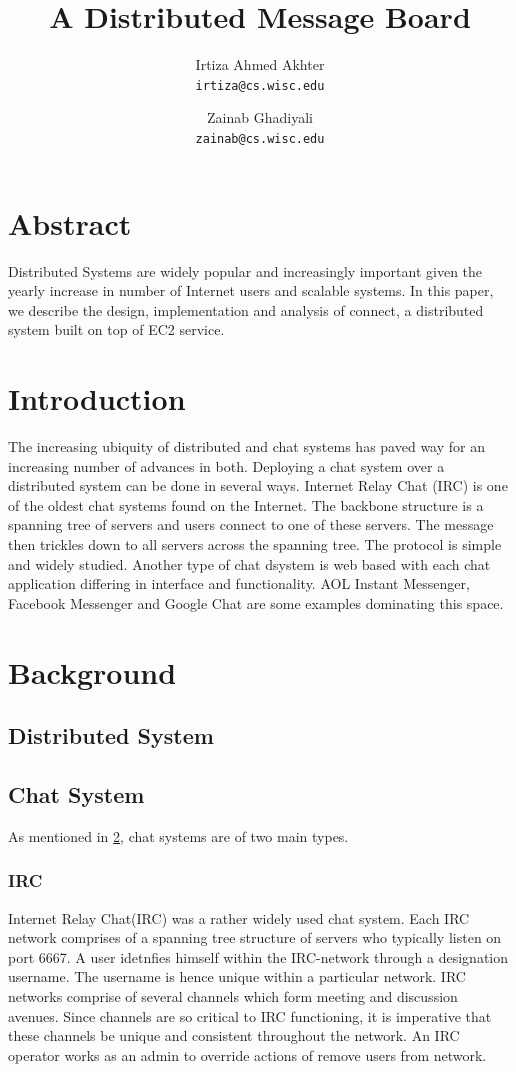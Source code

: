 \documentclass[12pt]{article}
\title{A Distributed Message Board}
\author{Irtiza Ahmed Akhter\\
\texttt{irtiza@cs.wisc.edu} \and Zainab Ghadiyali\\ \texttt{zainab@cs.wisc.edu}}
\begin{document}
\maketitle



\section{Abstract}
Distributed Systems are widely popular and increasingly important given the yearly increase in number of Internet users and scalable systems. In this paper, we describe the design, implementation and analysis of connect, a distributed system built on top of EC2 service. 
\section{Introduction}
\label{Introduction}
The increasing ubiquity of distributed and chat systems has paved way for an increasing number of advances in both. Deploying a chat system over a distributed system can be done in several ways. Internet Relay Chat (IRC) is one of the oldest chat systems found on the Internet. The backbone structure is a spanning tree of servers and users connect to one of these servers. The message then trickles down to all servers across the spanning tree. The protocol is simple and widely studied. Another type of chat dsystem is web based with each chat application differing in interface and functionality. AOL Instant Messenger, Facebook Messenger and Google Chat are some examples dominating this space.
 
\section{Background}
\label{Background}
\subsection{Distributed System}
\subsection{Chat System}
As mentioned in \ref{Introduction}, chat systems are of two main types. 
\subsubsection{IRC}
Internet Relay Chat(IRC\cite{IRC}) was a rather widely used chat system. Each IRC network comprises of a spanning tree structure of servers who typically listen on port 6667. A user idetnfies himself within the IRC-network through a designation username. The username is hence unique within a particular network. 
IRC networks comprise of several channels which form meeting and discussion avenues. Since channels are so critical to IRC functioning, it is imperative that these channels be unique and consistent throughout the network. An IRC operator works as an admin to override actions of remove users from network. 
\end{document}
